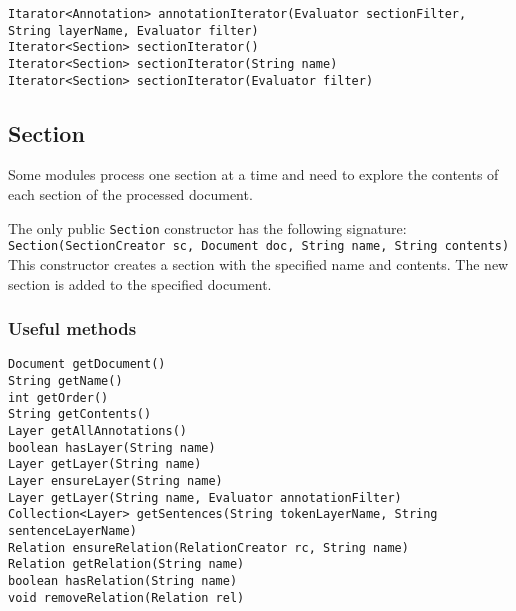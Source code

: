 \documentclass[a4paper]{article}
\begin{document}
\texttt{Itarator<Annotation> annotationIterator(Evaluator sectionFilter, String layerName, Evaluator filter)}\\
\texttt{Iterator<Section> sectionIterator()}\\
\texttt{Iterator<Section> sectionIterator(String name)}\\
\texttt{Iterator<Section> sectionIterator(Evaluator filter)}\\

\subsection{Section}
Some modules process one section at a time and need to explore the contents of each section of the processed document.

The only public \texttt{Section} constructor has the following signature:
\texttt{Section(SectionCreator sc, Document doc, String name, String contents)}\\
This constructor creates a section with the specified name and contents.
The new section is added to the specified document.

\subsubsection{Useful methods}

\texttt{Document getDocument()}\\
\texttt{String getName()}\\
\texttt{int getOrder()}\\
\texttt{String getContents()}\\

\texttt{Layer getAllAnnotations()}\\
\texttt{boolean hasLayer(String name)}\\
\texttt{Layer getLayer(String name)}\\
\texttt{Layer ensureLayer(String name)}\\
\texttt{Layer getLayer(String name, Evaluator annotationFilter)}\\
\texttt{Collection<Layer> getSentences(String tokenLayerName, String sentenceLayerName)}\\

\texttt{Relation ensureRelation(RelationCreator rc, String name)}\\
\texttt{Relation getRelation(String name)}\\
\texttt{boolean hasRelation(String name)}\\
\texttt{void removeRelation(Relation rel)}\\
\end{document}
